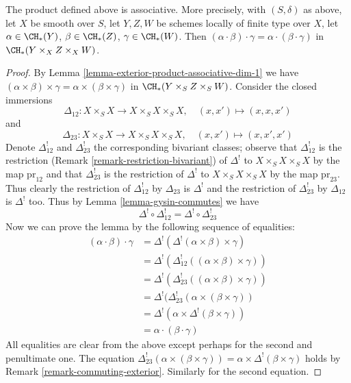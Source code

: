 \begin{lemma}
\label{lemma-associative-dim-1}
The product defined above is associative. More precisely, with
$(S, \delta)$ as above, let $X$ be smooth over $S$,
let $Y, Z, W$ be schemes locally of finite type over $X$, let
$\alpha \in \CH_*(Y)$, $\beta \in \CH_*(Z)$, $\gamma \in \CH_*(W)$.
Then $(\alpha \cdot \beta) \cdot \gamma =
\alpha \cdot (\beta \cdot \gamma)$ in $\CH_*(Y \times_X Z \times_X W)$.
\end{lemma}

\begin{proof}
By Lemma \ref{lemma-exterior-product-associative-dim-1} we have
$(\alpha \times \beta) \times \gamma =
\alpha \times (\beta \times \gamma)$ in $\CH_*(Y \times_S Z \times_S W)$.
Consider the closed immersions
$$
\Delta_{12} : X \times_S X \longrightarrow X \times_S X \times_S X,
\quad (x, x') \mapsto (x, x, x')
$$
and
$$
\Delta_{23} : X \times_S X \longrightarrow X \times_S X \times_S X,
\quad (x, x') \mapsto (x, x', x')
$$
Denote $\Delta_{12}^!$ and $\Delta_{23}^!$ the corresponding bivariant
classes; observe that $\Delta_{12}^!$ is the restriction
(Remark \ref{remark-restriction-bivariant}) of $\Delta^!$
to $X \times_S X \times_S X$ by the map $\text{pr}_{12}$ and that
$\Delta_{23}^!$ is the restriction of $\Delta^!$
to $X \times_S X \times_S X$ by the map $\text{pr}_{23}$.
Thus clearly the restriction of $\Delta_{12}^!$ by $\Delta_{23}$
is $\Delta^!$ and the restriction of $\Delta_{23}^!$ by $\Delta_{12}$ is
$\Delta^!$ too. Thus by Lemma \ref{lemma-gysin-commutes} we have
$$
\Delta^! \circ \Delta_{12}^! =
\Delta^! \circ \Delta_{23}^! 
$$
Now we can prove the lemma by the following sequence of equalities:
\begin{align*}
(\alpha \cdot \beta) \cdot \gamma
& =
\Delta^!(\Delta^!(\alpha \times \beta) \times \gamma) \\
& =
\Delta^!(\Delta_{12}^!((\alpha \times \beta) \times \gamma)) \\
& =
\Delta^!(\Delta_{23}^!((\alpha \times \beta) \times \gamma)) \\
& =
\Delta^!(\Delta_{23}^!(\alpha \times (\beta \times \gamma)) \\
& =
\Delta^!(\alpha \times \Delta^!(\beta \times \gamma)) \\
& =
\alpha \cdot (\beta \cdot \gamma)
\end{align*}
All equalities are clear from the above except perhaps
for the second and penultimate one. The equation
$\Delta_{23}^!(\alpha \times (\beta \times \gamma)) =
\alpha \times \Delta^!(\beta \times \gamma)$ holds by
Remark \ref{remark-commuting-exterior}. Similarly for the second
equation.
\end{proof}

